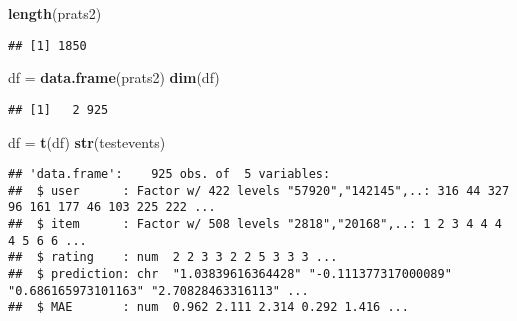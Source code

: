 \documentclass[]{article}
\newenvironment{Shaded}{\begin{snugshade}}{\end{snugshade}}
\newcommand{\DecValTok}[1]{\textcolor[rgb]{0.00,0.00,0.81}{#1}}
\newcommand{\KeywordTok}[1]{\textcolor[rgb]{0.13,0.29,0.53}{\textbf{#1}}}
\newcommand{\NormalTok}[1]{#1}
\newcommand{\OperatorTok}[1]{\textcolor[rgb]{0.81,0.36,0.00}{\textbf{#1}}}
\newcommand{\StringTok}[1]{\textcolor[rgb]{0.31,0.60,0.02}{#1}}
\begin{document}
\begin{Shaded}
\begin{Highlighting}[]
\KeywordTok{length}\NormalTok{(prats2)}
\end{Highlighting}
\end{Shaded}

\begin{verbatim}
## [1] 1850
\end{verbatim}

\begin{Shaded}
\begin{Highlighting}[]
\NormalTok{df =}\StringTok{ }\KeywordTok{data.frame}\NormalTok{(prats2)}
\KeywordTok{dim}\NormalTok{(df)}
\end{Highlighting}
\end{Shaded}

\begin{verbatim}
## [1]   2 925
\end{verbatim}

\begin{Shaded}
\begin{Highlighting}[]
\NormalTok{df =}\StringTok{ }\KeywordTok{t}\NormalTok{(df)}
\KeywordTok{str}\NormalTok{(testevents)}
\end{Highlighting}
\end{Shaded}

\begin{verbatim}
## 'data.frame':    925 obs. of  5 variables:
##  $ user      : Factor w/ 422 levels "57920","142145",..: 316 44 327 96 161 177 46 103 225 222 ...
##  $ item      : Factor w/ 508 levels "2818","20168",..: 1 2 3 4 4 4 4 5 6 6 ...
##  $ rating    : num  2 2 3 3 2 2 5 3 3 3 ...
##  $ prediction: chr  "1.03839616364428" "-0.111377317000089" "0.686165973101163" "2.70828463316113" ...
##  $ MAE       : num  0.962 2.111 2.314 0.292 1.416 ...
\end{verbatim}

\begin{Shaded}
\end{Shaded}
\end{document}
